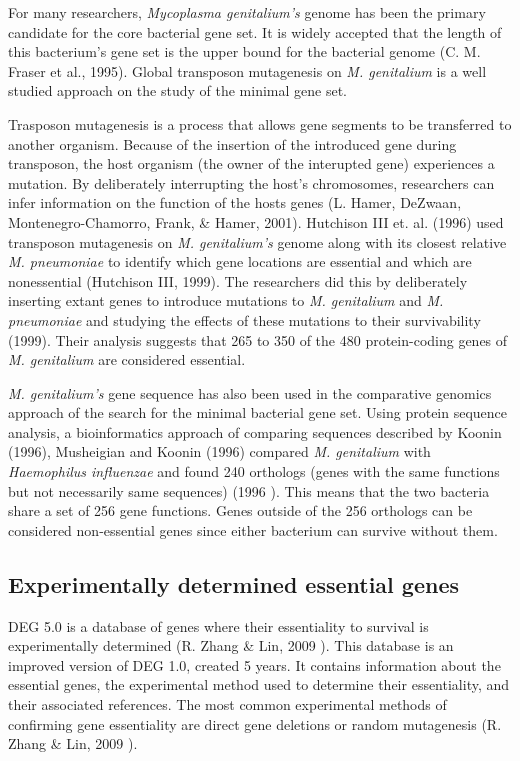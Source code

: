 \documentclass[]{report}
\begin{document}
For many researchers, \emph{Mycoplasma genitalium's} genome has been the
primary candidate for the core bacterial gene set. It is widely accepted
that the length of this bacterium's gene set is the upper bound for the
bacterial genome (C. M. Fraser et al., 1995). Global transposon
mutagenesis on \emph{M. genitalium} is a well studied approach on the
study of the minimal gene set.

Trasposon mutagenesis is a process that allows gene segments to be
transferred to another organism. Because of the insertion of the
introduced gene during transposon, the host organism (the owner of the
interupted gene) experiences a mutation. By deliberately interrupting
the host's chromosomes, researchers can infer information on the
function of the hosts genes (L. Hamer, DeZwaan, Montenegro-Chamorro,
Frank, \& Hamer, 2001). Hutchison III et. al. (1996) used transposon
mutagenesis on \emph{M. genitalium's} genome along with its closest
relative \emph{M. pneumoniae} to identify which gene locations are
essential and which are nonessential (Hutchison III, 1999). The
researchers did this by deliberately inserting extant genes to introduce
mutations to \emph{M. genitalium} and \emph{M. pneumoniae} and studying
the effects of these mutations to their survivability (1999). Their
analysis suggests that 265 to 350 of the 480 protein-coding genes of
\emph{M. genitalium} are considered essential.

\emph{M. genitalium's} gene sequence has also been used in the
comparative genomics approach of the search for the minimal bacterial
gene set. Using protein sequence analysis, a bioinformatics approach of
comparing sequences described by Koonin (1996), Musheigian and Koonin
(1996) compared \emph{M. genitalium} with \emph{Haemophilus influenzae}
and found 240 orthologs (genes with the same functions but not
necessarily same sequences) (1996 ). This means that the two bacteria
share a set of 256 gene functions. Genes outside of the 256 orthologs
can be considered non-essential genes since either bacterium can survive
without them.

\subsection{Experimentally determined essential
genes}\label{experimentally-determined-essential-genes}

DEG 5.0 is a database of genes where their essentiality to survival is
experimentally determined (R. Zhang \& Lin, 2009 ). This database is an
improved version of DEG 1.0, created 5 years. It contains information
about the essential genes, the experimental method used to determine
their essentiality, and their associated references. The most common
experimental methods of confirming gene essentiality are direct gene
deletions or random mutagenesis (R. Zhang \& Lin, 2009 ).
\end{document}

